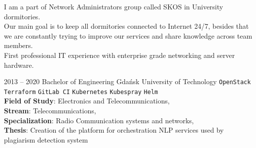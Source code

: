 \documentclass[9pt]{style/developercv}
\begin{document}
\begin{entrylist}
{      I am a part of Network Administrators group called SKOS in University dormitories.\\
      Our main goal is to keep all dormitories connected to Internet 24/7,
      besides that we are constantly trying to improve our services and share knowledge across team members.\\
			First professional IT experience with enterprise grade networking and server hardware.
		}
\end{entrylist}



\begin{entrylist}
	\entry
		{2013 -- 2020}
    {Bachelor of Engineering}
    {Gdańsk University of Technology}
    {
      \texttt{OpenStack}\slashsep
      \texttt{Terraform}\slashsep
      \texttt{GitLab CI}\slashsep
			\texttt{Kubernetes}\slashsep
			\texttt{Kubespray}\slashsep
			\texttt{Helm}\\

      \textbf{Field of Study}: Electronics and Telecommunications, \\
      \textbf{Stream}: Telecommunications,\\
      \textbf{Specialization}: Radio Communication systems and networks,\\
      \textbf{Thesis}: Creation of the platform for orchestration NLP services used by plagiarism detection system\\
    }
		{}
\end{entrylist}

\end{document}
